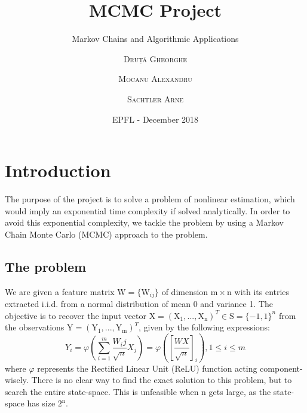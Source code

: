 \documentclass{scrartcl}
\title{MCMC Project}
\subtitle{Markov Chains and Algorithmic Applications}
\author{\textsc{Druță Gheorghe} \and \textsc{Mocanu Alexandru} \and \textsc{Sachtler Arne}}
\date{EPFL - December 2018}
\begin{document}
\maketitle

\section{Introduction}
The purpose of the project is to solve a problem of nonlinear estimation, which would imply an exponential time complexity if solved analytically. In order to avoid this exponential complexity, we tackle the problem by using a Markov Chain Monte Carlo (MCMC) approach to the problem.

\subsection{The problem}
We are given a feature matrix $\mathrm{W} = \{\mathrm{W}_{ij}\}$ of dimension $\mathrm{m} \times \mathrm{n}$ with its entries extracted i.i.d. from a normal distribution of mean 0 and variance 1. The objective is to recover the input vector $\mathrm{X} = (\mathrm{X_1}, ..., \mathrm{X_n})^T \in \mathrm{S} = \{-1, 1\}^n$ from the observations $\mathrm{Y} = (\mathrm{Y_1}, ..., \mathrm{Y_m})^T$, given by the following expressions:
\begin{equation}
Y_i = \varphi \left( \sum_{i=1}^m \frac{W_ij}{\sqrt{n}} X_j \right) = \varphi \left( \left[ \frac{WX}{\sqrt{n}} \right]_i \right), 1 \le i \le m
\end{equation}
where $\varphi$ represents the Rectified Linear Unit (ReLU) function acting component-wisely.
There is no clear way to find the exact solution to this problem, but to search the entire state-space. This is unfeasible when $\mathrm{n}$ gets large, as the state-space has size $2^\mathrm{n}$.
\end{document}
